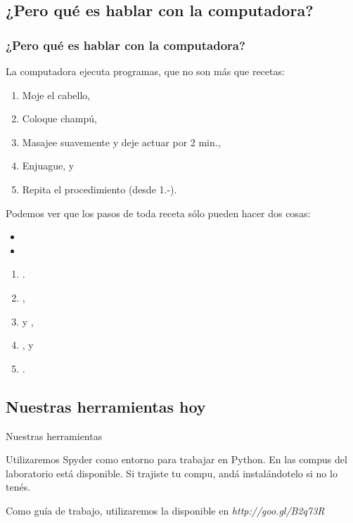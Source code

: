 \documentclass{beamer}
\begin{document}
\subsection{¿Pero qué es hablar con la computadora?}
\begin{frame}
    \frametitle{¿Pero qué es hablar con la computadora?}
    La computadora ejecuta programas, que no son más que recetas:
    \begin{enumerate}
        \item Moje el cabello,
        \item Coloque champú,
        \item Masajee suavemente y deje actuar por 2 min.,
        \item Enjuague, y
        \item Repita el procedimiento (desde 1.-).
    \end{enumerate}
    
\end{frame}

\begin{frame}[fragile]
    Podemos ver que los pasos de toda receta sólo pueden hacer dos cosas:

    \begin{itemize}
        \item{}
        \item{}
    \end{itemize}
    \vskip 20pt
    \begin{enumerate}
        \item {}.
        \item {},
        \item {} y ,
        \item {}, y
        \item {}.
    \end{enumerate}
    
    
\end{frame}

\subsection{Nuestras herramientas hoy}
\begin{frame}[fragile]{Nuestras herramientas}

Utilizaremos Spyder como entorno para trabajar en Python. En las compus del laboratorio está disponible. Si trajiste tu compu, andá instalándotelo si no lo tenés.

\vskip11pt

Como guía de trabajo, utilizaremos la disponible en \emph{http://goo.gl/B2q73R}

\end{frame}
\end{document}
